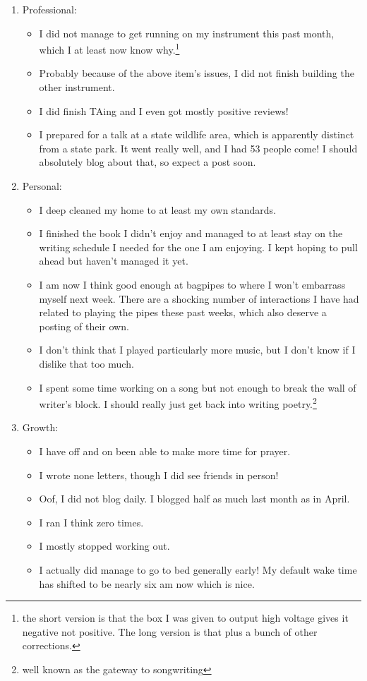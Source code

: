 \documentclass[12pt]{article}[titlepage]
\renewcommand{\,}{\textsuperscript{,}}
\begin{document}
\begin{enumerate}
\item Professional:
\begin{itemize}
\item I did not manage to get running on my instrument this past month, which I at least now know why.\footnote{the short version is that the box I was given to output high voltage gives it negative not positive. The long version is that plus a bunch of other corrections.}
\item Probably because of the above item's issues, I did not finish building the other instrument.
\item I did finish TAing and I even got mostly positive reviews!
\item I prepared for a talk at a state wildlife area, which is apparently distinct from a state park. It went really well, and I had 53 people come! I should absolutely blog about that, so expect a post soon.
\end{itemize}
\item Personal:
\begin{itemize}
\item I deep cleaned my home to at least my own standards.
\item I finished the book I didn't enjoy and managed to at least stay on the writing schedule I needed for the one I am enjoying. I kept hoping to pull ahead but haven't managed it yet.
\item I am now I think good enough at bagpipes to where I won't embarrass myself next week. There are a shocking number of interactions I have had related to playing the pipes these past weeks, which also deserve a posting of their own.
\item I don't think that I played particularly more music, but I don't know if I dislike that too much.
\item I spent some time working on a song but not enough to break the wall of writer's block. I should really just get back into writing poetry.\footnote{well known as the gateway to songwriting}
\end{itemize}
\item Growth:
\begin{itemize}
\item I have off and on been able to make more time for prayer.
\item I wrote none letters, though I did see friends in person!
\item Oof, I did not blog daily. I blogged half as much last month as in April.
\item I ran I think zero times.
\item I mostly stopped working out. 
\item I actually did manage to go to bed generally early! My default wake time has shifted to be nearly six am now which is nice.
\end{itemize}
\end{enumerate}
\end{document}
